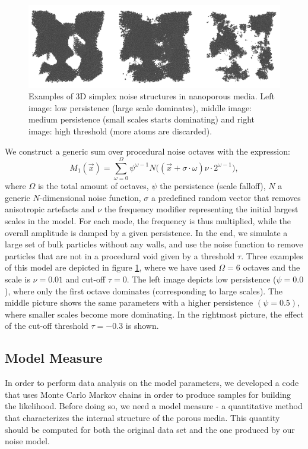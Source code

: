 \documentclass[aps,pre,twocolumn,letterpaper,floatfix,showpacs]{revtex4}
\begin{document}
\begin{figure}
\includegraphics[width=.95\textwidth]{model_examples.png}
\caption{Examples of 3D simplex noise structures in nanoporous media. Left image: low persistence (large scale dominates), middle image: medium persistence (small scales starts dominating) and right image: high threshold (more atoms are discarded). }
\label{fig:model_example}
\end{figure}
We construct a generic sum over procedural noise octaves with the expression: 
\begin{equation}
  M_1(\vec x) = \sum_{\omega=0}^{\Omega} \psi^{\omega -1}   N\big((\vec x + \sigma \cdot \omega)\nu \cdot 2^{\omega-1} \big),
\label{eq:noisemodel1}
\end{equation}
where $\Omega$ is the total amount of octaves, $\psi$ the persistence (scale falloff), $N$ a generic $N$-dimensional noise function, $\sigma$ a predefined random vector that removes anisotropic artefacts and $\nu$ the frequency modifier representing the initial largest scales in the model. For each mode, the frequency is thus multiplied, while the overall amplitude is damped by a given persistence. In the end, we simulate a large set of bulk particles without any walls, and use the noise function to remove particles that are not in a procedural void given by a threshold $\tau$. Three examples of this model are depicted in figure \ref{fig:model_example}, where we have used $\Omega=6$ octaves and the scale is $\nu=0.01$ and cut-off $\tau=0$. The left image depicts low persistence ($\psi = 0.0$), where only the first octave dominates (corresponding to large scales). The middle picture shows the same parameters with a higher persistence $(\psi = 0.5)$, where smaller scales become more dominating. In the rightmost picture, the effect of the cut-off threshold $\tau = -0.3$ is shown.   


\subsection{Model Measure}
In order to perform data analysis on the model parameters, we developed a code that uses Monte Carlo Markov chains in order to produce samples for building the likelihood. Before doing so, we need a model measure - a quantitative method that characterizes the internal structure of the porous media. This quantity should be computed for both the original data set and the one produced by our noise model. 
\end{document}
